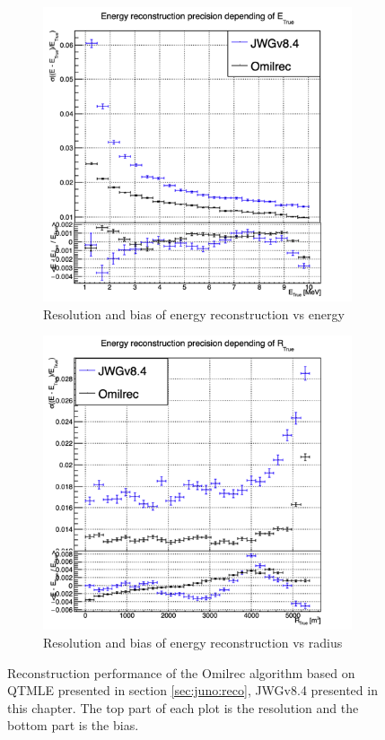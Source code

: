 \documentclass[../main.tex]{subfiles}
\begin{document}
\begin{figure}[ht]
  \centering
  \begin{subfigure}[t]{0.48\linewidth}
    \centering
    \includegraphics[width=\linewidth]{images/jgnn/MESBvET_nox.png}
    \caption{Resolution and bias of energy reconstruction vs energy}
    \label{fig:jgnn:MESBvETC_nox}
  \end{subfigure}
  \begin{subfigure}[t]{0.48\linewidth}
    \centering
    \includegraphics[width=\linewidth]{images/jgnn/MESBvRT_nox.png}
    \caption{Resolution and bias of energy reconstruction vs radius}
    \label{fig:jgnn:MESBvRTC_nox}
  \end{subfigure}
  \caption{Reconstruction performance of the Omilrec algorithm based on QTMLE presented in section \ref{sec:juno:reco}, JWGv8.4 presented in this chapter. The top part of each plot is the resolution and the bottom part is the bias.}
  \label{fig:jgnn:results_nox_1}
\end{figure}
\end{document}
